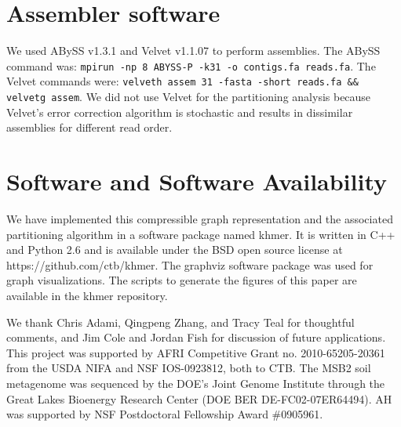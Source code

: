 \documentclass{pnastwo}
\begin{document}
\begin{article}
\begin{materials}
\section{Assembler software}

We used ABySS v1.3.1 and Velvet v1.1.07 to perform assemblies.  The
ABySS command was: {\tt mpirun -np 8 ABYSS-P -k31 -o contigs.fa
  reads.fa}.  The Velvet commands were: {\tt velveth assem 31 -fasta
  -short reads.fa \&\& velvetg assem}.  We did not use Velvet for the
partitioning analysis because Velvet's error correction algorithm is
stochastic and results in dissimilar assemblies for different read
order.

\section{Software and Software Availability}

We have implemented this compressible graph representation and the
associated partitioning algorithm in a software package named khmer.
It is written in C++ and Python 2.6 and is available under the BSD
open source license at https://github.com/ctb/khmer.  The graphviz
software package was used for graph visualizations. The scripts to
generate the figures of this paper are available in the khmer
repository.

\end{materials}

\begin{acknowledgments}

We thank Chris Adami, Qingpeng Zhang, and Tracy Teal for thoughtful
comments, and Jim Cole and Jordan Fish for discussion of future
applications.  This project was supported by AFRI Competitive Grant
no. 2010-65205-20361 from the USDA NIFA and NSF IOS-0923812, both to
CTB.  The MSB2 soil metagenome was sequenced by the DOE's Joint Genome
Institute through the Great Lakes Bioenergy Research Center
(DOE BER DE-FC02-07ER64494).
AH was supported by NSF Postdoctoral Fellowship Award
\#0905961.


\end{acknowledgments}


%

%

\begin{thebibliography}{10}


\end{thebibliography}
\end{article}
\end{document}
